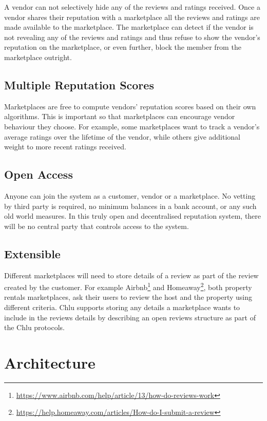 \documentclass[a4paper]{article}
\begin{document}
A vendor can not selectively hide any of the reviews and ratings
received. Once a vendor shares their reputation with a marketplace all
the reviews and ratings are made available to the marketplace. The
marketplace can detect if the vendor is not revealing any of the
reviews and ratings and thus refuse to show the vendor's reputation on
the marketplace, or even further, block the member from the
marketplace outright.

\subsection{Multiple Reputation Scores}

Marketplaces are free to compute vendors' reputation scores based on
their own algorithms. This is important so that marketplaces can
encourage vendor behaviour they choose. For example, some marketplaces
want to track a vendor's average ratings over the lifetime of the
vendor, while others give additional weight to more recent ratings
received.

\subsection{Open Access}

Anyone can join the system as a customer, vendor or a marketplace. No
vetting by third party is required, no minimum balances in a bank
account, or any such old world measures. In this truly open and
decentralised reputation system, there will be no central party that
controls access to the system.

\subsection{Extensible}

Different marketplaces will need to store details of a review as part
of the review created by the customer. For example
Airbnb\footnote{\url{https://www.airbnb.com/help/article/13/how-do-reviews-work}}
and
Homeaway\footnote{\url{https://help.homeaway.com/articles/How-do-I-submit-a-review}},
both property rentals marketplaces, ask their users to review the host
and the property using different criteria. Chlu supports storing any
details a marketplace wants to include in the reviews details by
describing an open reviews structure as part of the Chlu protocols.

\section{Architecture}
\end{document}
